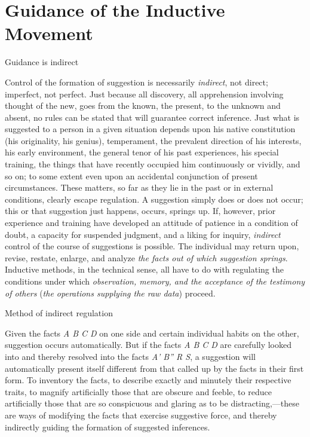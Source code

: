 \documentclass[letterpaper]{book}
\begin{document}
\section{Guidance of the Inductive Movement}

Guidance is indirect

Control of the formation of suggestion is necessarily \emph{indirect},
not direct; imperfect, not perfect. Just because all discovery, all
apprehension involving thought of the new, goes from the known, the
present, to the unknown and absent, no rules can be stated that will
guarantee correct inference. Just what is suggested to a person in a
given situation depends upon his native constitution (his originality,
his genius), temperament, the prevalent direction of his interests, his
early environment, the general tenor of his past experiences, his
special training, the things that have recently occupied him
continuously or vividly, and so on; to some extent even upon an
accidental conjunction of present circumstances. These matters, so far
as they lie in the past or in external conditions, clearly escape
regulation. A suggestion simply does or does not occur; this or that
suggestion just happens, occurs, springs up. If, however, prior
experience and training have developed an attitude of patience in a
condition of doubt, a capacity for suspended judgment, and a liking for
inquiry, \emph{indirect} control of the course of suggestions is
possible.
The individual may return upon, revise, restate, enlarge, and analyze
\emph{the facts out of which suggestion springs}. Inductive methods, in
the technical sense, all have to do with regulating the conditions under
which \emph{observation, memory, and the acceptance of the testimony of
others} (\emph{the operations supplying the raw data}) proceed.

Method of indirect regulation

Given the facts \emph{A B C D} on one side and certain individual habits
on the other, suggestion occurs automatically. But if the facts \emph{A
B C D} are carefully looked into and thereby resolved into the facts
\emph{A' B'' R S}, a suggestion will automatically present itself
different from that called up by the facts in their first form. To
inventory the facts, to describe exactly and minutely their respective
traits, to magnify artificially those that are obscure and feeble, to
reduce artificially those that are so conspicuous and glaring as to be
distracting,---these are ways of modifying the facts that exercise
suggestive force, and thereby indirectly guiding the formation of
suggested inferences.
\end{document}
